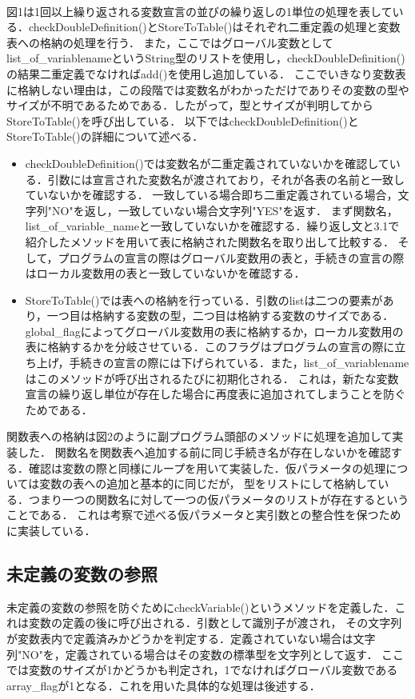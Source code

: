 \documentclass[dvipdfmx]{jarticle}
\begin{document}
  \\図1は1回以上繰り返される変数宣言の並びの繰り返しの1単位の処理を表している．checkDoubleDefinition()とStoreToTable()はそれぞれ二重定義の処理と変数表への格納の処理を行う．
また，ここではグローバル変数としてlist\_of\_variablenameというString型のリストを使用し，checkDoubleDefinition()の結果二重定義でなければadd()を使用し追加している．
ここでいきなり変数表に格納しない理由は，この段階では変数名がわかっただけでありその変数の型やサイズが不明であるためである．したがって，型とサイズが判明してからStoreToTable()を呼び出している．
以下ではcheckDoubleDefinition()とStoreToTable()の詳細について述べる．
\begin{itemize}
  \item checkDoubleDefinition()では変数名が二重定義されていないかを確認している．引数には宣言された変数名が渡されており，それが各表の名前と一致していないかを確認する．
  一致している場合即ち二重定義されている場合，文字列"NO"を返し，一致していない場合文字列"YES"を返す．
  まず関数名，list\_of\_variable\_nameと一致していないかを確認する．繰り返し文と3.1で紹介したメソッドを用いて表に格納された関数名を取り出して比較する．
  そして，プログラムの宣言の際はグローバル変数用の表と，手続きの宣言の際はローカル変数用の表と一致していないかを確認する．
  \item StoreToTable()では表への格納を行っている．引数のlistは二つの要素があり，一つ目は格納する変数の型，二つ目は格納する変数のサイズである．
  global\_flagによってグローバル変数用の表に格納するか，ローカル変数用の表に格納するかを分岐させている．このフラグはプログラムの宣言の際に立ち上げ，手続きの宣言の際には下げられている．また，list\_of\_variablenameはこのメソッドが呼び出されるたびに初期化される．
  これは，新たな変数宣言の繰り返し単位が存在した場合に再度表に追加されてしまうことを防ぐためである．
\end{itemize}
関数表への格納は図2のように副プログラム頭部のメソッドに処理を追加して実装した．
関数名を関数表へ追加する前に同じ手続き名が存在しないかを確認する．確認は変数の際と同様にループを用いて実装した．仮パラメータの処理については変数の表への追加と基本的に同じだが，
型をリストにして格納している．つまり一つの関数名に対して一つの仮パラメータのリストが存在するということである．
これは考察で述べる仮パラメータと実引数との整合性を保つために実装している．
\subsection{未定義の変数の参照}
未定義の変数の参照を防ぐためにcheckVariable()というメソッドを定義した．これは変数の定義の後に呼び出される．引数として識別子が渡され，
その文字列が変数表内で定義済みかどうかを判定する．定義されていない場合は文字列"NO"を，定義されている場合はその変数の標準型を文字列として返す．
ここでは変数のサイズが1かどうかも判定され，1でなければグローバル変数であるarray\_flagが1となる．これを用いた具体的な処理は後述する．
\end{document}
